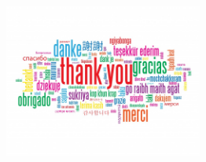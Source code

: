 \documentclass[xcolor=x11names,compress, 
]{beamer}
\theoremstyle{definition} \newtheorem{esempio}{Esempio}
\theoremstyle{definition}
\begin{document}
	\begin{frame}
		\begin{center}
			\includegraphics[width=6.5cm]{./immagini/thanks}
		\end{center}
	\end{frame}
\end{document}
